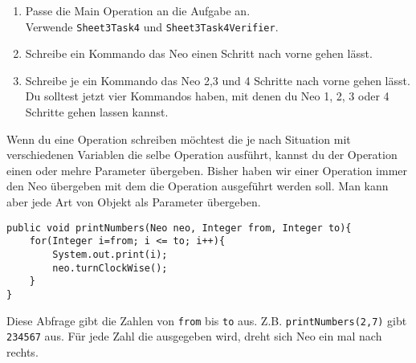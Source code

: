 
\begin{enumerate}
	\item 
		Passe die Main Operation an die Aufgabe an.\\
		Verwende \lstinline{Sheet3Task4} und \lstinline{Sheet3Task4Verifier}.
	\item 
		Schreibe ein Kommando das Neo einen Schritt nach vorne gehen lässt.
	\item 
		Schreibe je ein Kommando das Neo 2,3 und 4 Schritte nach vorne gehen lässt.
		Du solltest jetzt vier Kommandos haben, mit denen du Neo 1, 2, 3 oder 4 Schritte gehen lassen kannst.
\end{enumerate}

\begin{Infobox}
	Wenn du eine Operation schreiben möchtest die je nach Situation mit verschiedenen Variablen die selbe Operation ausführt, kannst du der Operation einen oder mehre Parameter übergeben. 
	Bisher haben wir einer Operation immer den Neo übergeben mit dem die Operation ausgeführt werden soll.
	Man kann aber jede Art von Objekt als Parameter übergeben.
	
	\begin{lstlisting}[xleftmargin=0.5cm]
public void printNumbers(Neo neo, Integer from, Integer to){
    for(Integer i=from; i <= to; i++){
		System.out.print(i);
		neo.turnClockWise();
    }
}
	\end{lstlisting}

	Diese Abfrage gibt die Zahlen von \lstinline{from} bis \lstinline{to} aus. 
	Z.B. \lstinline{printNumbers(2,7)} gibt \lstinline{234567} aus.
	Für jede Zahl die ausgegeben wird, dreht sich Neo ein mal nach rechts.
\end {Infobox}


